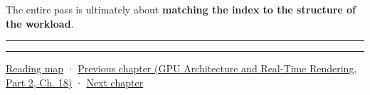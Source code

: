 The entire pass is ultimately about \textbf{matching the index to the structure of the workload}.

\begin{center}\rule{0.5\linewidth}{0.5pt}\end{center}

\begin{center}\rule{0.5\linewidth}{0.5pt}\end{center}

\hyperref[volume-reading-map]{Reading map} · \href{../06-GPU-Architecture-and-Real-Time-Rendering-P02/main.pdf\#nameddest=06-engine-ii-ch027-preparing-and-publishing-runtime-content}{Previous chapter (GPU Architecture and Real-Time Rendering, Part 2, Ch. 18)} · \hyperref[06-engine-ii-ch029-dynamic-spatial-indices-for-moving-worlds]{Next chapter}
